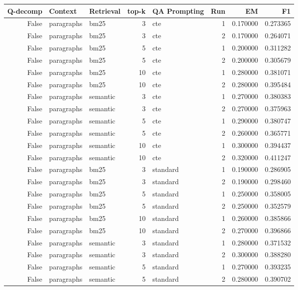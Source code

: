 \begin{tabular}{rllrlrrr}
\toprule
Q-decomp & Context & Retrieval & top-k & QA Prompting & Run & EM & F1 \\
\midrule
False & paragraphs & bm25 & 3 & cte & 1 & 0.170000 & 0.273365 \\
False & paragraphs & bm25 & 3 & cte & 2 & 0.170000 & 0.264071 \\
False & paragraphs & bm25 & 5 & cte & 1 & 0.200000 & 0.311282 \\
False & paragraphs & bm25 & 5 & cte & 2 & 0.200000 & 0.305679 \\
False & paragraphs & bm25 & 10 & cte & 1 & 0.280000 & 0.381071 \\
False & paragraphs & bm25 & 10 & cte & 2 & 0.280000 & 0.395484 \\
False & paragraphs & semantic & 3 & cte & 1 & 0.270000 & 0.380383 \\
False & paragraphs & semantic & 3 & cte & 2 & 0.270000 & 0.375963 \\
False & paragraphs & semantic & 5 & cte & 1 & 0.290000 & 0.380747 \\
False & paragraphs & semantic & 5 & cte & 2 & 0.260000 & 0.365771 \\
False & paragraphs & semantic & 10 & cte & 1 & 0.300000 & 0.394437 \\
False & paragraphs & semantic & 10 & cte & 2 & 0.320000 & 0.411247 \\
False & paragraphs & bm25 & 3 & standard & 1 & 0.190000 & 0.286905 \\
False & paragraphs & bm25 & 3 & standard & 2 & 0.190000 & 0.298460 \\
False & paragraphs & bm25 & 5 & standard & 1 & 0.250000 & 0.358005 \\
False & paragraphs & bm25 & 5 & standard & 2 & 0.250000 & 0.352579 \\
False & paragraphs & bm25 & 10 & standard & 1 & 0.260000 & 0.385866 \\
False & paragraphs & bm25 & 10 & standard & 2 & 0.270000 & 0.396866 \\
False & paragraphs & semantic & 3 & standard & 1 & 0.280000 & 0.371532 \\
False & paragraphs & semantic & 3 & standard & 2 & 0.300000 & 0.388280 \\
False & paragraphs & semantic & 5 & standard & 1 & 0.270000 & 0.393235 \\
False & paragraphs & semantic & 5 & standard & 2 & 0.280000 & 0.390702 \\

\end{tabular}
